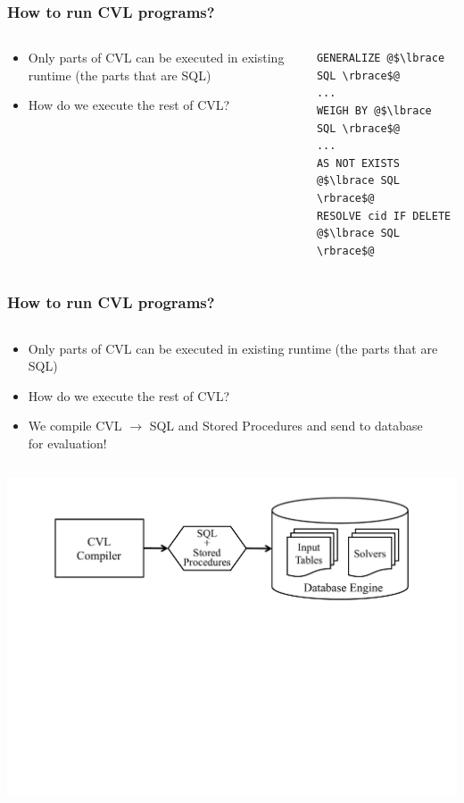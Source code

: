 \documentclass{beamer}
\begin{document}
\begin{frame}[fragile,t]
  \frametitle{How to run CVL programs?}
  \begin{columns}[t]
	\begin{column}[l]{5.5cm}
		\begin{itemize}[<+->]
  			\item Only parts of CVL can be executed in existing runtime (the parts that are SQL) 
  			\item How do we execute the rest of CVL?
  		\end{itemize}
	\end{column}
	\begin{column}[r]{5.5cm}
\begin{lstlisting}[escapechar=@]
GENERALIZE @$\lbrace SQL \rbrace$@ 
...
WEIGH BY @$\lbrace SQL \rbrace$@
...
AS NOT EXISTS
@$\lbrace SQL \rbrace$@
RESOLVE cid IF DELETE 
@$\lbrace SQL \rbrace$@
\end{lstlisting}
	\end{column}
  \end{columns}
\end{frame}

\begin{frame}[fragile,t]
  \frametitle{How to run CVL programs?}
  \begin{columns}[t]
	\begin{column}[l]{5.5cm}
		\begin{itemize}
  			\item Only parts of CVL can be executed in existing runtime (the parts that are SQL) 
  			\item How do we execute the rest of CVL?
			\item We compile CVL $\rightarrow$ SQL and Stored Procedures and send to database for evaluation!
  		\end{itemize}
	\end{column}
	\begin{column}[r]{5.5cm}
	\end{column}
  \end{columns}
    \begin{center}
  \includegraphics[scale=0.3]{figs/indatabase-execution.pdf}
  \end{center}

\end{frame}
\end{document}
